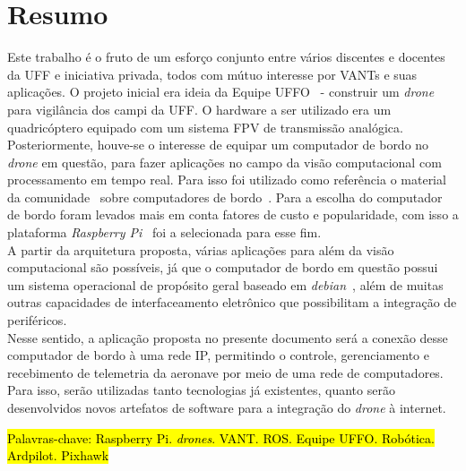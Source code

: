 \documentclass[12pt,a4paper,oneside]{book}
\begin{document}
\pagebreak




\chapter*{Resumo}
%
%
\thispagestyle{myheadings}
%
Este trabalho é o fruto de um esforço conjunto entre vários discentes e docentes da UFF e iniciativa privada, todos com mútuo 
interesse por VANTs e suas aplicações. O projeto inicial era ideia da Equipe UFFO~\cite{url:equipeuffo} - construir um \textit{drone} 
para vigilância dos campi da UFF. O hardware a ser utilizado era um quadricóptero equipado com um sistema FPV de transmissão analógica. 
Posteriormente, houve-se o interesse de equipar um computador de bordo no \textit{drone} em questão, para fazer aplicações no campo 
da visão computacional com processamento em tempo real. Para isso foi utilizado como referência o material da comunidade~\cite{url:ardupilotdoc} 
sobre computadores de bordo~\cite{url:ardupilot-companioncomputers}. Para a escolha do computador de bordo foram levados mais em conta fatores de custo e popularidade, com isso a plataforma \textit{Raspberry Pi}~\cite{url:raspberrypi} foi a selecionada para esse fim.\\
%
A partir da arquitetura proposta, várias aplicações para além da visão computacional são possíveis, já que o computador de bordo em questão 
possui um sistema operacional de propósito geral baseado em \textit{debian}~\cite{url:debian}, além de muitas outras capacidades de interfaceamento eletrônico que possibilitam a integração de periféricos.\\
%
Nesse sentido, a aplicação proposta no presente documento será a conexão desse computador de bordo à uma rede IP, permitindo o controle, gerenciamento e recebimento de telemetria da aeronave por meio de uma rede de computadores. Para isso, serão utilizadas tanto tecnologias já existentes, quanto serão desenvolvidos novos artefatos de software para a integração do \textit{drone} à internet.
%

\bigskip

\hl{ Palavras-chave: Raspberry Pi. \textit{drones}. VANT. ROS. Equipe UFFO. Robótica. Ardpilot. Pixhawk}
\end{document}
